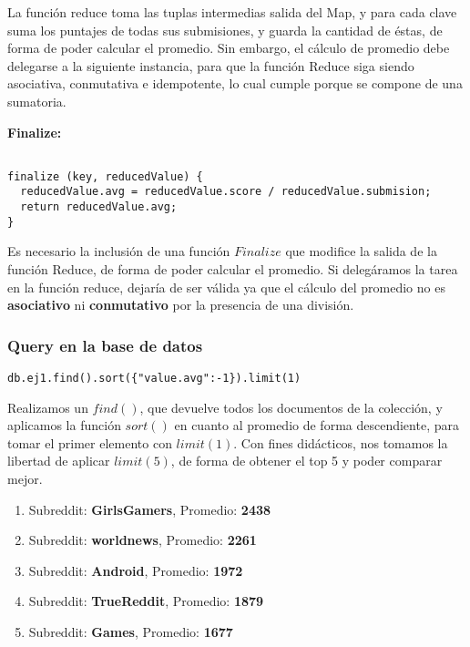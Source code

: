 La funci\'on reduce toma las tuplas intermedias salida del Map, y para cada clave suma los puntajes de todas sus submisiones, y guarda la cantidad de \'estas, de forma de poder calcular el promedio. Sin embargo, el c\'alculo de promedio debe delegarse a la siguiente instancia, para que la funci\'on Reduce siga siendo asociativa, conmutativa e idempotente, lo cual cumple porque se compone de una sumatoria.

\vspace{2mm}

\textbf{Finalize:}

\begin{lstlisting}

finalize (key, reducedValue) {
  reducedValue.avg = reducedValue.score / reducedValue.submision;
  return reducedValue.avg;
}

\end{lstlisting}

Es necesario la inclusi\'on de una funci\'on $Finalize$ que modifice la salida de la funci\'on Reduce, de forma de poder calcular el promedio. Si deleg\'aramos la tarea en la funci\'on reduce, dejar\'ia de ser v\'alida ya que el c\'alculo del promedio no es \textbf{asociativo} ni \textbf{conmutativo} por la presencia de una divisi\'on.

\vspace{2mm}

\subsubsection{Query en la base de datos}


\begin{lstlisting}
db.ej1.find().sort({"value.avg":-1}).limit(1)
\end{lstlisting}

Realizamos un $find()$, que devuelve todos los documentos de la colecci\'on, y aplicamos la funci\'on $sort()$ en cuanto al promedio de forma descendiente, para tomar el primer elemento con $limit(1)$. Con fines did\'acticos, nos tomamos la libertad de aplicar $limit(5)$, de forma de obtener el top 5 y poder comparar mejor.

\begin{enumerate}

\item Subreddit: \textbf{GirlsGamers}, Promedio: \textbf{2438} 
\item Subreddit: \textbf{worldnews}, Promedio: \textbf{2261}  
\item Subreddit: \textbf{Android}, Promedio: \textbf{1972}  
\item Subreddit: \textbf{TrueReddit}, Promedio: \textbf{1879}  
\item Subreddit: \textbf{Games}, Promedio: \textbf{1677}  


\end{enumerate}

